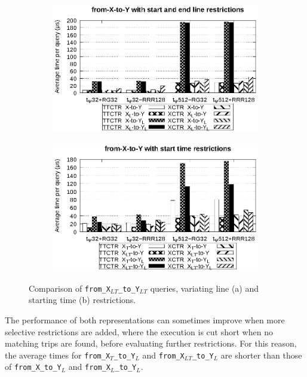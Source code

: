     \begin{figure}[ht]
    \begin{subfigure}{0.5\linewidth}
    \includegraphics[width=\linewidth]{experiments/xy0.eps}
    \vspace{-12pt}
    \caption{}
    \vspace{-12pt}
    \end{subfigure}%
    \begin{subfigure}{0.5\linewidth}
    \includegraphics[width=\linewidth]{experiments/xy1.eps}
    \vspace{-12pt}
    \caption{}
    \vspace{-12pt}
    \end{subfigure}
    \caption{Comparison of \texttt{from\_X$_{LT}$\_to\_Y$_{LT}$} queries, variating line (a) and starting time (b) restrictions.}
    \label{fig:xy0}
    \end{figure}
    
    The performance of both representations can sometimes improve  when more selective restrictions are added, where the execution is cut short when no matching trips are found, before evaluating further restrictions. For this reason, the average times for \texttt{from\_X$_{T}$\_to\_Y$_{L}$} and \texttt{from\_X$_{LT}$\_to\_Y$_{L}$} are shorter than those of \texttt{from\_X\_to\_Y$_{L}$} and \texttt{from\_X$_{L}$\_to\_Y$_{L}$}.
    
